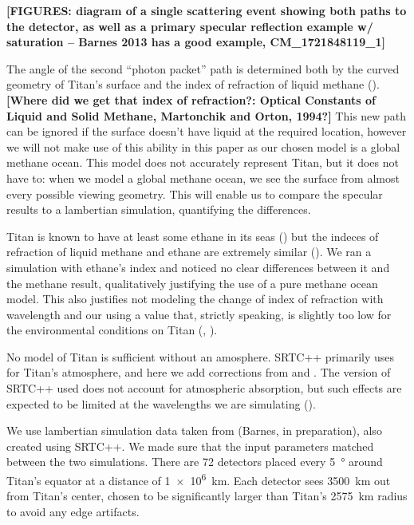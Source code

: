 \documentclass{article}
\begin{document}
\textbf{\color{red} [FIGURES: diagram of a single scattering event showing both paths to the detector, as well as a primary specular reflection example w/ saturation -- Barnes 2013 has a good example, CM\_1721848119\_1] \color{black}}

The angle of the second ``photon packet'' path is determined both by the curved geometry of Titan's surface and the index of refraction of liquid methane (). \textbf{\color{red} [Where did we get that index of refraction?: Optical Constants of Liquid and Solid Methane, Martonchik and Orton, 1994?] \color{black}} This new path can be ignored if the surface doesn't have liquid at the required location, however we will not make use of this ability in this paper as our chosen model is a global methane ocean. This model does not accurately represent Titan, but it does not have to: when we model a global methane ocean, we see the surface from almost every possible viewing geometry. This will enable us to compare the specular results to a lambertian simulation, quantifying the differences. 

Titan is known to have at least some ethane in its seas (\cite{Mastrogiuseppe2016}) but the indeces of refraction of liquid methane and ethane are extremely similar (\cite{Kanjanasakul2020}). We ran a simulation with ethane's index and noticed no clear differences between it and the methane result, qualitatively justifying the use of a pure methane ocean model. This also justifies not modeling the change of index of refraction with wavelength and our using a value that, strictly speaking, is slightly too low for the environmental conditions on Titan (\cite{Martonchik1994}, \cite{Jennings2019}).

No model of Titan is sufficient without an amosphere. SRTC++ primarily uses \cite{Tomasko2008} for Titan's atmosphere, and here we add corrections from \cite{Hirtzig2013} and \cite{Rodriguez2018}. The version of SRTC++ used does not account for atmospheric absorption, but such effects are expected to be limited at the wavelengths we are simulating (\cite{EsSayeh2023}).

We use lambertian simulation data taken from (Barnes, in preparation), also created using SRTC++. We made sure that the input parameters matched between the two simulations. There are 72 detectors placed every \qty{5}{\degree} around Titan's equator at a distance of \qty{1e6}{\kilo\meter}. Each detector sees \qty{3500}{\kilo\meter} out from Titan's center, chosen to be significantly larger than Titan's \qty{2575}{\kilo\meter} radius to avoid any edge artifacts. 
\end{document}
